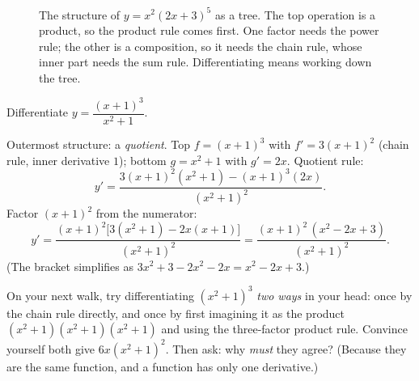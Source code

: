 \begin{figure}[htbp]
\centering
{}
\caption{The structure of $y=x^2(2x+3)^5$ as a tree. The top operation is a product, so
the product rule comes first. One factor needs the power rule; the other is a
composition, so it needs the chain rule, whose inner part needs the sum rule.
Differentiating means working down the tree.}
\label{ch11:fig-tree}
\end{figure}

\begin{example}\label{ch11:ex-combo2}
Differentiate $y = \dfrac{(x+1)^3}{x^2+1}$.

Outermost structure: a \emph{quotient}. Top $f = (x+1)^3$ with $f' = 3(x+1)^2$ (chain
rule, inner derivative $1$); bottom $g = x^2+1$ with $g' = 2x$. Quotient rule:
\[
  y' = \frac{3(x+1)^2(x^2+1) - (x+1)^3(2x)}{(x^2+1)^2}.
\]
Factor $(x+1)^2$ from the numerator:
\[
  y' = \frac{(x+1)^2\big[3(x^2+1) - 2x(x+1)\big]}{(x^2+1)^2}
     = \frac{(x+1)^2\,(x^2 - 2x + 3)}{(x^2+1)^2}.
\]
(The bracket simplifies as $3x^2+3-2x^2-2x = x^2-2x+3$.)
\end{example}

\begin{walkbox}
On your next walk, try differentiating $(x^2+1)^3$ \emph{two ways} in your head:
once by the chain rule directly, and once by first imagining it as the product
$(x^2+1)(x^2+1)(x^2+1)$ and using the three-factor product rule. Convince yourself both
give $6x(x^2+1)^2$. Then ask: why \emph{must} they agree? (Because they are the same
function, and a function has only one derivative.)
\end{walkbox}

